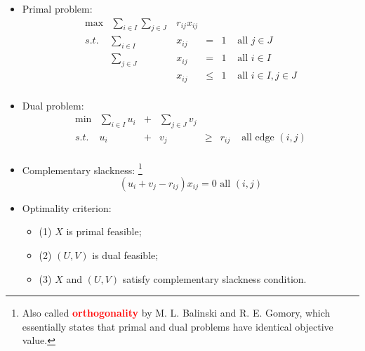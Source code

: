 \documentclass[mathserif]{beamer}
\begin{document}
{\begin{itemize}
	\item Primal problem: 
\[
\begin{array}{rrrrrl}
 \max &  \sum_{i \in I}  \sum_{j \in J}& r_{ij} x_{ij} &  &       & \\
s.t.      &  \sum_{i \in I}                             & x_{ij}          & =&1     & \text{ all } j \in J\\
           &  \sum_{j \in J}                             & x_{ij}          & =&1      & \text{ all } i \in I\\
           &                                                         &x_{ij}           & \leq& 1 & \text{ all } i \in I, j \in J\\
\end{array} 
\]
	\item Dual problem: 
\[
\begin{array}{rrrrrrl}
 \min &  \sum_{i \in I}  u_{i} &+& \sum_{j \in J} v_{j} &          &                 & \\
s.t.      &                               u_{i} &+&                            v_{j} & \geq & r_{ij}     & \text{ all edge } (i, j)  \\
\end{array} \label{2} %
\]
	\item Complementary slackness: \footnote{Also called \textcolor{red}{\bf orthogonality} by M. L. Balinski and R. E. Gomory, which essentially states that  primal and dual problems  have identical objective value. }
\[
 (u_{i} + v_{j} - r_{ij} ) x_{ij} = 0  \text{ all } (i, j)
 \] 
	\item Optimality criterion: 
		\begin{itemize} 
			\item (1) $X$ is primal feasible; 
			\item (2) $(U, V)$ is dual feasible; 
			\item (3) $X$ and $(U, V)$ satisfy complementary slackness condition. 
		\end{itemize} 
\end{itemize}

}
\end{document}
